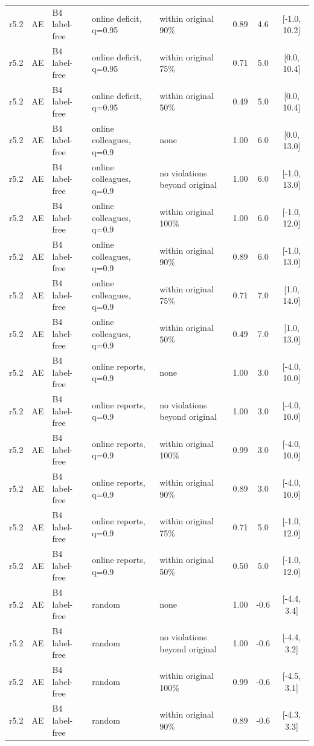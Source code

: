 \begin{longtable}{lllp{4.2cm}p{3.4cm}ccc}
r5.2 & AE & B4 label-free & online deficit, q=0.95 & within original 90\% & 0.89 & 4.6 & [-1.0, 10.2] \\
r5.2 & AE & B4 label-free & online deficit, q=0.95 & within original 75\% & 0.71 & 5.0 & [0.0, 10.4] \\
r5.2 & AE & B4 label-free & online deficit, q=0.95 & within original 50\% & 0.49 & 5.0 & [0.0, 10.4] \\
r5.2 & AE & B4 label-free & online colleagues, q=0.9 & none & 1.00 & 6.0 & [0.0, 13.0] \\
r5.2 & AE & B4 label-free & online colleagues, q=0.9 & no violations beyond original & 1.00 & 6.0 & [-1.0, 13.0] \\
r5.2 & AE & B4 label-free & online colleagues, q=0.9 & within original 100\% & 1.00 & 6.0 & [-1.0, 12.0] \\
r5.2 & AE & B4 label-free & online colleagues, q=0.9 & within original 90\% & 0.89 & 6.0 & [-1.0, 13.0] \\
r5.2 & AE & B4 label-free & online colleagues, q=0.9 & within original 75\% & 0.71 & 7.0 & [1.0, 14.0] \\
r5.2 & AE & B4 label-free & online colleagues, q=0.9 & within original 50\% & 0.49 & 7.0 & [1.0, 13.0] \\
r5.2 & AE & B4 label-free & online reports, q=0.9 & none & 1.00 & 3.0 & [-4.0, 10.0] \\
r5.2 & AE & B4 label-free & online reports, q=0.9 & no violations beyond original & 1.00 & 3.0 & [-4.0, 10.0] \\
r5.2 & AE & B4 label-free & online reports, q=0.9 & within original 100\% & 0.99 & 3.0 & [-4.0, 10.0] \\
r5.2 & AE & B4 label-free & online reports, q=0.9 & within original 90\% & 0.89 & 3.0 & [-4.0, 10.0] \\
r5.2 & AE & B4 label-free & online reports, q=0.9 & within original 75\% & 0.71 & 5.0 & [-1.0, 12.0] \\
r5.2 & AE & B4 label-free & online reports, q=0.9 & within original 50\% & 0.50 & 5.0 & [-1.0, 12.0] \\
r5.2 & AE & B4 label-free & random & none & 1.00 & -0.6 & [-4.4, 3.4] \\
r5.2 & AE & B4 label-free & random & no violations beyond original & 1.00 & -0.6 & [-4.4, 3.2] \\
r5.2 & AE & B4 label-free & random & within original 100\% & 0.99 & -0.6 & [-4.5, 3.1] \\
r5.2 & AE & B4 label-free & random & within original 90\% & 0.89 & -0.6 & [-4.3, 3.3] \\

\end{longtable}
